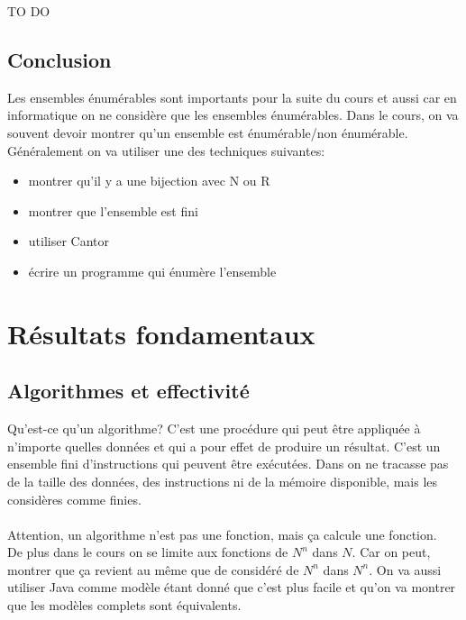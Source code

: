 \documentclass[11pt,a4paper]{article}
\begin{document}
TO DO


\subsection{Conclusion}
\label{sub:conclusion}
Les ensembles énumérables sont importants pour la suite du cours et aussi car en 
informatique on ne considère que les ensembles énumérables.
Dans le cours, on va souvent devoir montrer qu'un ensemble est énumérable/non énumérable.
Généralement on va utiliser une des techniques suivantes: 
\begin{itemize}
	\item montrer qu'il y a une bijection avec N ou R
	\item montrer que l'ensemble est fini
	\item utiliser Cantor
	\item écrire un programme qui énumère l'ensemble
\end{itemize}


\section{Résultats fondamentaux}
\label{sec:r_sultats_fondamentaux}

\subsection{Algorithmes et effectivité}
\label{sub:algorithmes_et_effectivit_}
Qu'est-ce qu'un algorithme? C'est une procédure qui peut être appliquée à n'importe
quelles données et qui a pour effet de produire un résultat. C'est un ensemble fini
d'instructions qui peuvent être exécutées. Dans on ne tracasse pas de la taille des données,
des instructions ni de la mémoire disponible, mais les considères comme finies. 

\paragraph{}
Attention, un algorithme n'est pas une fonction, mais ça calcule une fonction.\\
De plus dans le cours on se limite aux fonctions de $N^n$ dans $N$. Car on peut,
montrer que ça revient au même que de considéré de $N^n$ dans $N^n$. On va aussi
utiliser Java comme modèle étant donné que c'est plus facile et qu'on va montrer 
que les modèles complets sont équivalents.
\end{document}
